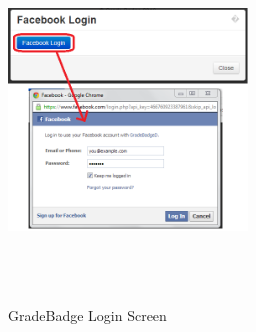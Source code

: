 \vspace{3em}
\begin{figure}[H]
\begin{center}
\includegraphics[height=3.8in,width=2.5in]{images/facebook-login.jpg}
\caption{GradeBadge Login Screen}
\label{fig:login_screen}
\end{center}
\end{figure}

